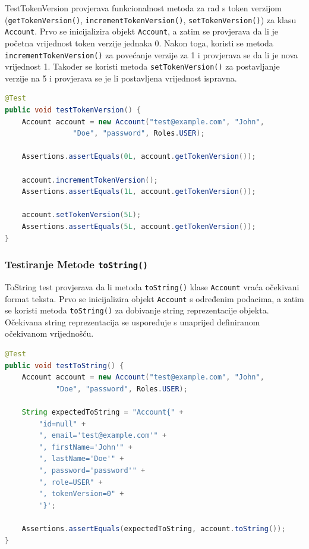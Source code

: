 			TestTokenVersion provjerava funkcionalnost metoda za rad s token verzijom \\(\texttt{getTokenVersion()}, \texttt{incrementTokenVersion()}, \texttt{setTokenVersion()}) za klasu \texttt{Account}. Prvo se inicijalizira objekt \texttt{Account}, a zatim se provjerava da li je početna vrijednost token verzije jednaka 0. Nakon toga, koristi se metoda \texttt{incrementTokenVersion()} za povećanje verzije za 1 i provjerava se da li je nova vrijednost 1. Također se koristi metoda \texttt{setTokenVersion()} za postavljanje verzije na 5 i provjerava se je li postavljena vrijednost ispravna.
			
			\begin{lstlisting}[language=Java]
@Test
public void testTokenVersion() {
	Account account = new Account("test@example.com", "John", 
				"Doe", "password", Roles.USER);
	
	Assertions.assertEquals(0L, account.getTokenVersion());
	
	account.incrementTokenVersion();
	Assertions.assertEquals(1L, account.getTokenVersion());
	
	account.setTokenVersion(5L);
	Assertions.assertEquals(5L, account.getTokenVersion());
}
			\end{lstlisting}
			
			\subsubsection{Testiranje Metode \texttt{toString()}}
			
			ToString test provjerava da li metoda \texttt{toString()} klase \texttt{Account} vraća očekivani format teksta. Prvo se inicijalizira objekt \texttt{Account} s određenim podacima, a zatim se koristi metoda \texttt{toString()} za dobivanje string reprezentacije objekta. Očekivana string reprezentacija se uspoređuje s unaprijed definiranom očekivanom vrijednošću.
			
			\begin{lstlisting}[language=Java]
@Test
public void testToString() {
	Account account = new Account("test@example.com", "John", 
			"Doe", "password", Roles.USER);
	
	String expectedToString = "Account{" +
		"id=null" +
		", email='test@example.com'" +
		", firstName='John'" +
		", lastName='Doe'" +
		", password='password'" +
		", role=USER" +
		", tokenVersion=0" +
		'}';
	
	Assertions.assertEquals(expectedToString, account.toString());
}
			\end{lstlisting}
			

